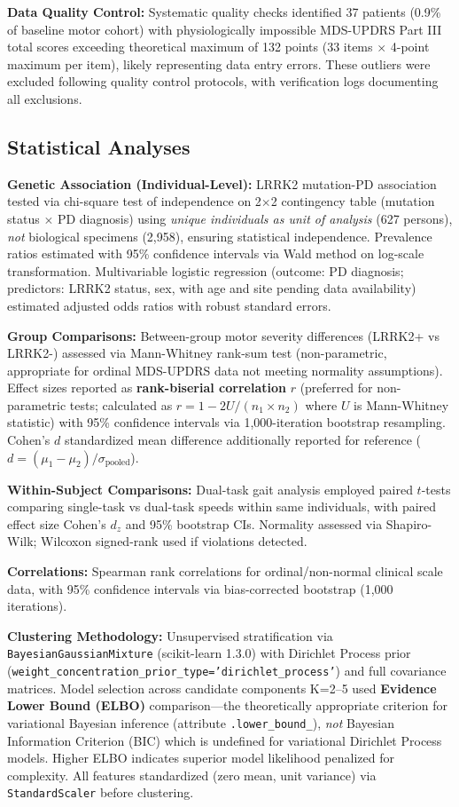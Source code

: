 \documentclass[11pt]{article}
\begin{document}
\textbf{Data Quality Control:} Systematic quality checks identified 37 patients (0.9\% of baseline motor cohort) with physiologically impossible MDS-UPDRS Part III total scores exceeding theoretical maximum of 132 points (33 items $\times$ 4-point maximum per item), likely representing data entry errors. These outliers were excluded following quality control protocols, with verification logs documenting all exclusions.

\subsection{Statistical Analyses}

\textbf{Genetic Association (Individual-Level):} LRRK2 mutation-PD association tested via chi-square test of independence on 2$\times$2 contingency table (mutation status $\times$ PD diagnosis) using \textit{unique individuals as unit of analysis} (627 persons), \textit{not} biological specimens (2,958), ensuring statistical independence. Prevalence ratios estimated with 95\% confidence intervals via Wald method on log-scale transformation. Multivariable logistic regression (outcome: PD diagnosis; predictors: LRRK2 status, sex, with age and site pending data availability) estimated adjusted odds ratios with robust standard errors.

\textbf{Group Comparisons:} Between-group motor severity differences (LRRK2+ vs LRRK2-) assessed via Mann-Whitney rank-sum test (non-parametric, appropriate for ordinal MDS-UPDRS data not meeting normality assumptions). Effect sizes reported as \textbf{rank-biserial correlation} $r$ (preferred for non-parametric tests; calculated as $r = 1 - 2U/(n_1 \times n_2)$ where $U$ is Mann-Whitney statistic) with 95\% confidence intervals via 1,000-iteration bootstrap resampling. Cohen's $d$ standardized mean difference additionally reported for reference ($d = (\mu_1 - \mu_2)/\sigma_{\text{pooled}}$).

\textbf{Within-Subject Comparisons:} Dual-task gait analysis employed paired $t$-tests comparing single-task vs dual-task speeds within same individuals, with paired effect size Cohen's $d_z$ and 95\% bootstrap CIs. Normality assessed via Shapiro-Wilk; Wilcoxon signed-rank used if violations detected.

\textbf{Correlations:} Spearman rank correlations for ordinal/non-normal clinical scale data, with 95\% confidence intervals via bias-corrected bootstrap (1,000 iterations).

\textbf{Clustering Methodology:} Unsupervised stratification via \texttt{BayesianGaussianMixture} (scikit-learn 1.3.0) with Dirichlet Process prior (\texttt{weight\_concentration\_prior\_type='dirichlet\_process'}) and full covariance matrices. Model selection across candidate components K=2--5 used \textbf{Evidence Lower Bound (ELBO)} comparison—the theoretically appropriate criterion for variational Bayesian inference (attribute \texttt{.lower\_bound\_}), \textit{not} Bayesian Information Criterion (BIC) which is undefined for variational Dirichlet Process models. Higher ELBO indicates superior model likelihood penalized for complexity. All features standardized (zero mean, unit variance) via \texttt{StandardScaler} before clustering.
\end{document}
